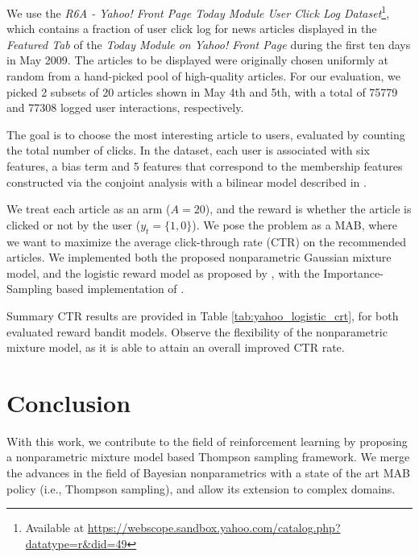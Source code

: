 \documentclass{article}
\newcommand{\ie}{i.e., }
\begin{document}
We use the \textit{R6A - Yahoo! Front Page Today Module User Click Log Dataset}\footnote{Available at \href{https://webscope.sandbox.yahoo.com/catalog.php?datatype=r\&did=49}{https://webscope.sandbox.yahoo.com/catalog.php?datatype=r\&did=49}}, which contains a fraction of user click log for news articles displayed in the \textit{Featured Tab} of the \textit{Today Module on Yahoo! Front Page} during the first ten days in May 2009. The articles to be displayed were originally chosen uniformly at random from a hand-picked pool of high-quality articles. For our evaluation, we picked 2 subsets of 20 articles shown in May 4th and 5th, with a total of 75779 and 77308 logged user interactions, respectively.

The goal is to choose the most interesting article to users, evaluated by counting the total number of clicks. In the dataset, each user is associated with six features, a bias term and 5 features that correspond to the membership features constructed via the conjoint analysis with a bilinear model described in \cite{ip-Chu2009}.

We treat each article as an arm ($A=20$), and the reward is whether the article is clicked or not by the user ($y_t=\{1,0\}$). We pose the problem as a MAB, where we want to maximize the average click-through rate (CTR) on the recommended articles. We implemented both the proposed nonparametric Gaussian mixture model, and the logistic reward model as proposed by \citet{ic-Chapelle2011}, with the Importance-Sampling based implementation of \citet{j-Urteaga2018}.

Summary CTR results are provided in Table \ref{tab:yahoo_logistic_crt}, for both evaluated reward bandit models. Observe the flexibility of the nonparametric mixture model, as it is able to attain an overall improved CTR rate.



\section{Conclusion}
\label{sec:conclusion}

With this work, we contribute to the field of reinforcement learning by proposing a nonparametric mixture model based Thompson sampling framework. We merge the advances in the field of Bayesian nonparametrics with a state of the art MAB policy (\ie Thompson sampling), and allow its extension to complex domains.
\end{document}
